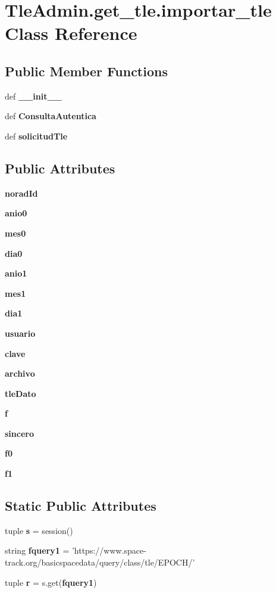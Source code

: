\section{\-Tle\-Admin.\-get\-\_\-tle.\-importar\-\_\-tle \-Class \-Reference}
\label{class_tle_admin_1_1get__tle_1_1importar__tle}
\subsection*{\-Public \-Member \-Functions}
\begin{DoxyCompactItemize}
\item 
def {\bf \-\_\-\-\_\-init\-\_\-\-\_\-}
\item 
def {\bf \-Consulta\-Autentica}
\item 
def {\bf solicitud\-Tle}
\end{DoxyCompactItemize}
\subsection*{\-Public \-Attributes}
\begin{DoxyCompactItemize}
\item 
{\bf norad\-Id}
\item 
{\bf anio0}
\item 
{\bf mes0}
\item 
{\bf dia0}
\item 
{\bf anio1}
\item 
{\bf mes1}
\item 
{\bf dia1}
\item 
{\bf usuario}
\item 
{\bf clave}
\item 
{\bf archivo}
\item 
{\bf tle\-Dato}
\item 
{\bf f}
\item 
{\bf sincero}
\item 
{\bf f0}
\item 
{\bf f1}
\end{DoxyCompactItemize}
\subsection*{\-Static \-Public \-Attributes}
\begin{DoxyCompactItemize}
\item 
tuple {\bf s} = session()
\item 
string {\bf fquery1} = 'https\-://www.\-space-\/track.\-org/basicspacedata/query/class/tle/\-E\-P\-O\-C\-H/'
\item 
tuple {\bf r} = s.\-get({\bf fquery1})
\end{DoxyCompactItemize}


